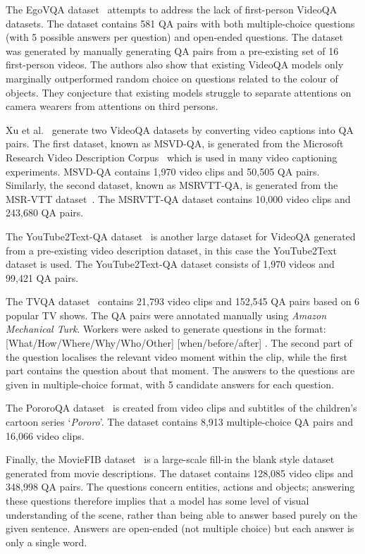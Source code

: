 \documentclass[../interim.tex]{subfiles}
\begin{document}
The EgoVQA dataset~\cite{dataset:ego-vqa} attempts to address the lack of first-person VideoQA datasets. The dataset contains 581 QA pairs with both multiple-choice questions (with 5 possible answers per question) and open-ended questions. The dataset was generated by manually generating QA pairs from a pre-existing set of 16 first-person videos. The authors also show that existing VideoQA models only marginally outperformed random choice on questions related to the colour of objects. They conjecture that existing models struggle to separate attentions on camera wearers from attentions on third persons.

Xu et al.~\cite{dataset:xu} generate two VideoQA datasets by converting video captions into QA pairs. The first dataset, known as MSVD-QA, is generated from the Microsoft Research Video Description Corpus~\cite{dataset:msvd} which is used in many video captioning experiments. MSVD-QA contains 1,970 video clips and 50,505 QA pairs. Similarly, the second dataset, known as MSRVTT-QA, is generated from the MSR-VTT dataset~\cite{dataset:msr-vtt}. The MSRVTT-QA dataset contains 10,000 video clips and 243,680 QA pairs.

The YouTube2Text-QA dataset~\cite{dataset:youtube2text-qa} is another large dataset for VideoQA generated from a pre-existing video description dataset, in this case the YouTube2Text~\cite{dataset:youtube2text} dataset is used. The YouTube2Text-QA dataset consists of 1,970 videos and 99,421 QA pairs.

The TVQA dataset~\cite{dataset:tvqa} contains 21,793 video clips and 152,545 QA pairs based on 6 popular TV shows. The QA pairs were annotated manually using \textit{Amazon Mechanical Turk}. Workers were asked to generate questions in the format: [What/How/Where/Why/Who/Other] \underline{\hspace{1cm}} [when/before/after] \underline{\hspace{1cm}}. The second part of the question localises the relevant video moment within the clip, while the first part contains the question about that moment. The answers to the questions are given in multiple-choice format, with 5 candidate answers for each question.

The PororoQA dataset~\cite{dataset:pororo-qa} is created from video clips and subtitles of the children's cartoon series `\textit{Pororo}'. The dataset contains 8,913 multiple-choice QA pairs and 16,066 video clips.

Finally, the MovieFIB dataset~\cite{dataset:movie-fib} is a large-scale fill-in the blank style dataset generated from movie descriptions. The dataset contains 128,085 video clips and 348,998 QA pairs. The questions concern entities, actions and objects; answering these questions therefore implies that a model has some level of visual understanding of the scene, rather than being able to answer based purely on the given sentence. Answers are open-ended (not multiple choice) but each answer is only a single word.
\end{document}
